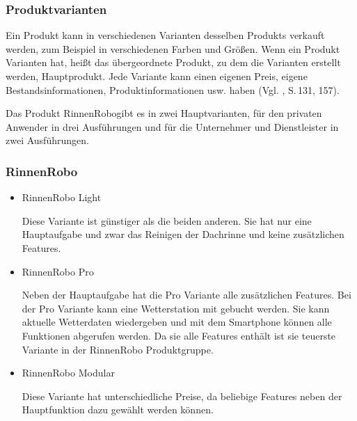     \subsubsection{Produktvarianten}
        Ein Produkt kann in verschiedenen Varianten desselben Produkts verkauft werden, zum Beispiel in verschiedenen
        Farben und Größen. Wenn ein Produkt Varianten hat, heißt das übergeordnete Produkt, zu dem die Varianten
        erstellt werden, Hauptprodukt. Jede Variante kann einen eigenen Preis, eigene Bestandsinformationen,
        Produktinformationen usw. haben (Vgl. \cite{Bruhn2012}, S.\,131, 157).
        
        Das Produkt \as RinnenRobo\adl gibt es in zwei Hauptvarianten, für den privaten Anwender in drei Ausführungen
        und für die Unternehmer und Dienstleister in zwei Ausführungen.
            
        \subsubsection{RinnenRobo}
            \begin{itemize}
                \item RinnenRobo Light
                
                    Diese Variante ist günstiger als die beiden anderen. Sie hat nur eine Hauptaufgabe und zwar das
                    Reinigen der Dachrinne und keine zusätzlichen Features. 

                \item RinnenRobo Pro
                
                    Neben der Hauptaufgabe hat die Pro Variante alle zusätzlichen Features. Bei der Pro Variante kann
                    eine Wetterstation mit gebucht werden. Sie kann aktuelle Wetterdaten wiedergeben und mit dem
                    Smartphone können alle Funktionen abgerufen werden. Da sie alle Features enthält ist sie teuerste
                    Variante in der RinnenRobo Produktgruppe. 

                \item RinnenRobo Modular
                
                    Diese Variante hat unterschiedliche Preise, da beliebige Features neben der Hauptfunktion dazu
                    gewählt werden können. 
            \end{itemize}

